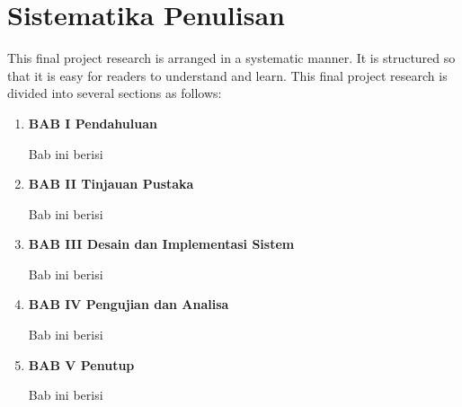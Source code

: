 \section{Sistematika Penulisan}
\label{sec:sistematikapenulisan}

This final project research is arranged in a systematic manner.
It is structured so that it is easy for readers to understand and learn.
This final project research is divided into several sections as follows:

\begin{enumerate}[nolistsep]

  \item \textbf{BAB I Pendahuluan}

        Bab ini berisi \lipsum[2][1-5]

        \vspace{2ex}

  \item \textbf{BAB II Tinjauan Pustaka}

        Bab ini berisi \lipsum[3][1-5]

        \vspace{2ex}

  \item \textbf{BAB III Desain dan Implementasi Sistem}

        Bab ini berisi \lipsum[4][1-5]

        \vspace{2ex}

  \item \textbf{BAB IV Pengujian dan Analisa}

        Bab ini berisi \lipsum[5][1-5]

        \vspace{2ex}

  \item \textbf{BAB V Penutup}

        Bab ini berisi \lipsum[6][1-5]

\end{enumerate}
